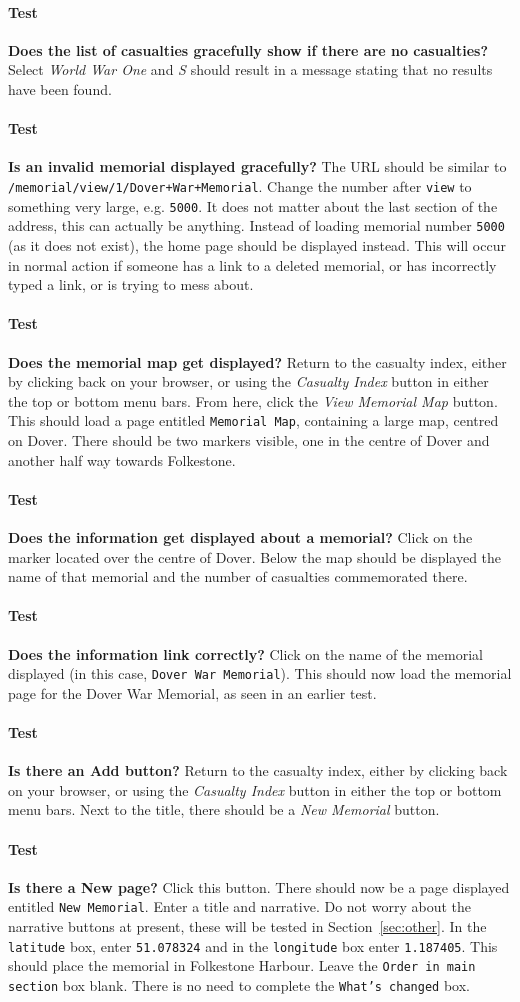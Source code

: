 \documentclass[12pt]{article}
\newcounter{Test}
\newcommand{\test}[1]{%
\stepcounter{Test}%
\paragraph{Test \theTest} \textbf{#1} }
\begin{document}
\test{Does the list of casualties gracefully show if there are no casualties?}
Select \textit{World War One} and \textit{S} should result in a message stating that no results have been found.

\test{Is an invalid memorial displayed gracefully?}
The URL should be similar to \texttt{/memorial/view/1/Dover+War+Memorial}. Change the number after \texttt{view} to something very large, e.g. \texttt{5000}. It does not matter about the last section of the address, this can actually be anything. Instead of loading memorial number \texttt{5000} (as it does not exist), the home page should be displayed instead. This will occur in normal action if someone has a link to a deleted memorial, or has incorrectly typed a link, or is trying to mess about.

\test{Does the memorial map get displayed?}
Return to the casualty index, either by clicking back on your browser, or using the \textit{Casualty Index} button in either the top or bottom menu bars. From here, click the \textit{View Memorial Map} button. This should load a page entitled \texttt{Memorial Map}, containing a large map, centred on Dover. There should be two markers visible, one in the centre of Dover and another half way towards Folkestone.

\test{Does the information get displayed about a memorial?}
Click on the marker located over the centre of Dover. Below the map should be displayed the name of that memorial and the number of casualties commemorated there.

\test{Does the information link correctly?}
Click on the name of the memorial displayed (in this case, \texttt{Dover War Memorial}). This should now load the memorial page for the Dover War Memorial, as seen in an earlier test.

\test{Is there an Add button?}
Return to the casualty index, either by clicking back on your browser, or using the \textit{Casualty Index} button in either the top or bottom menu bars. Next to the title, there should be a \textit{New Memorial} button.

\test{Is there a New page?}
Click this button. There should now be a page displayed entitled \texttt{New Memorial}. Enter a title and narrative. Do not worry about the narrative buttons at present, these will be tested in Section~\ref{sec:other}. In the \texttt{latitude} box, enter \texttt{51.078324} and in the \texttt{longitude} box enter \texttt{1.187405}. This should place the memorial in Folkestone Harbour. Leave the \texttt{Order in main section} box blank. There is no need to complete the \texttt{What's changed} box.
\end{document}
